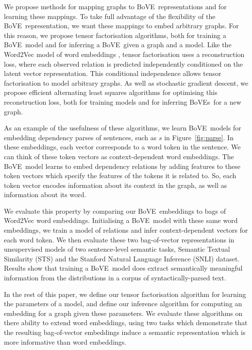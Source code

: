 \documentclass[11pt,a4paper]{article}
\newcommand{\bove}{Bo{\nolinebreak\hspace{-0.25ex}}VE}
\newcommand{\boves}{Bo{\nolinebreak\hspace{-0.25ex}}VEs}
\begin{document}
We propose methods for mapping graphs to \bove\ representations and for
learning these mappings.  To take full advantage of the flexibility of the
\bove\ representation, we want these mappings to embed arbitrary graphs.  For
this reason, we propose tensor factorisation algorithms, both for training a
\bove\ model and for inferring a \bove\ given a graph and a model.  Like the
Word2Vec model of word embeddings \cite{word2vec2_nips}, tensor factorisation
uses a reconstruction loss, where each observed relation is predicted
independently conditioned on the latent vector representation.  This
conditional independence allows tensor factorisation to model arbitrary
graphs.  As well as stochastic gradient descent, we propose efficient
alternating least squares algorithms for optimising this reconstruction loss,
both for training models and for inferring \boves\ for a new graph.

As an example of the usefulness of these algorithms, we learn \bove\ models
for embedding dependency parses of sentences, such as $s$ in
Figure~\ref{fig:parse}.  In these embeddings, each
vector corresponds to a word token in the sentence.  We can think of these
token vectors as context-dependent word embeddings.  The \bove\ model learns 
to embed dependency relations by adding features to these token vectors which
specify the features of the tokens it is related to.  So, each token vector
encodes information about its context in the graph, as well as information
about its word.

We evaluate this property by comparing our \bove\ embeddings
to bags of Word2Vec word embeddings.  Initialising a \bove\ model with these
same word embeddings, we train a model of relations and infer
context-dependent vectors for each word token.  We then evaluate these two
bag-of-vector representations in unsupervised models of two sentence-level
semantic tasks, Semantic Textual Similarity (STS) and the Stanford Natural
Language Inference (SNLI) dataset.  Results show that training a \bove\ model
does extract semantically meaningful information from the distributions in a
corpus of syntactically-parsed text.


In the rest of this paper, we define our tensor factorisation algorithm for
learning the parameters of a model, and define our inference algorithm for
computing an embedding for a graph given these parameters.
We evaluate these algorithms on there ability to extend word embeddings, using
two tasks which demonstrate that the resulting bag-of-vector embeddings induce
a semantic representation which is more informative than word embeddings.
\end{document}
